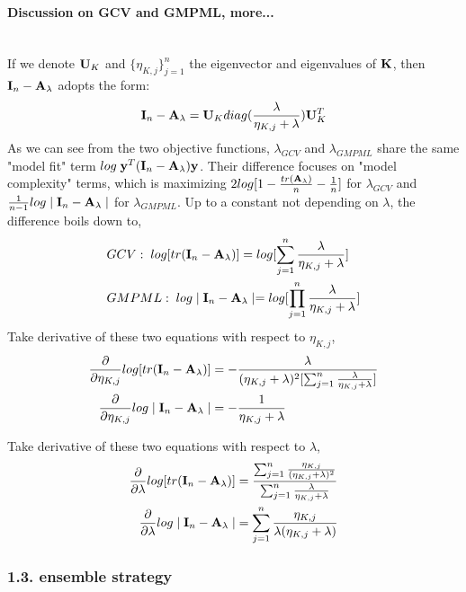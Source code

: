 \documentclass[11pt]{article}
\begin{document}
\paragraph{Discussion on GCV and GMPML, more...}\mbox{}\\
If we denote ${\bf U}_K$ and $\{\eta_{K,j}\}_{j=1}^n$ the eigenvector and eigenvalues of ${\bf K}$, then ${\bf I}_n-{\bf A}_\lambda$ adopts the form:
\begin{align*}
{\bf I}_n-{\bf A}_\lambda={\bf U}_K diag(\frac{\lambda}{\eta_{K,j}+\lambda}){\bf U}_K^T
\end{align*}
As we can see from the two objective functions, $\lambda_{GCV}$ and $\lambda_{GMPML}$ share the same "model fit" term $log\; {\bf y}^T({\bf I}_n-{\bf A}_\lambda){\bf y}$. Their difference focuses on "model complexity" terms, which is maximizing $2log[1-\frac{tr({\bf A}_\lambda)}{n}-\frac{1}{n}]$ for $\lambda_{GCV}$ and $\frac{1}{n-1}log \mid {\bf I}_n-{\bf A}_\lambda \mid$ for $\lambda_{GMPML}$. Up to a constant not depending on $\lambda$, the difference boils down to,
\begin{align}
&GCV: \; log[tr({\bf I}_n-{\bf A}_\lambda)]=log[\sum_{j=1}^n\frac{\lambda}{\eta_{K,j}+\lambda}]\\
&GMPML: \; log\mid {\bf I}_n-{\bf A}_\lambda\mid=log[\prod_{j=1}^n\frac{\lambda}{\eta_{K,j}+\lambda}]
\end{align}
Take derivative of these two equations with respect to $\eta_{K,j}$,
\begin{align*}
\frac{\partial }{\partial \eta_{K,j}}log[tr({\bf I}_n-{\bf A}_\lambda)]&=-\frac{\lambda}{(\eta_{K,j}+\lambda)^2[\sum_{j=1}^n\frac{\lambda}{\eta_{K,j}+\lambda}]}\\
\frac{\partial }{\partial \eta_{K,j}}log\mid {\bf I}_n-{\bf A}_\lambda\mid&=-\frac{1}{\eta_{K,j}+\lambda}
\end{align*}

Take derivative of these two equations with respect to $\lambda$,
\begin{align*}
\frac{\partial }{\partial \lambda}log[tr({\bf I}_n-{\bf A}_\lambda)]&=\frac{\sum_{j=1}^n\frac{\eta_{K,j}}{(\eta_{K,j}+\lambda)^2}}{\sum_{j=1}^n\frac{\lambda}{\eta_{K,j}+\lambda}}\\
\frac{\partial }{\partial \lambda}log\mid {\bf I}_n-{\bf A}_\lambda\mid&=\sum_{j=1}^n\frac{\eta_{K,j}}{\lambda(\eta_{K,j}+\lambda)}
\end{align*}


\subsubsection*{{1.3. ensemble strategy}}
\end{document}
